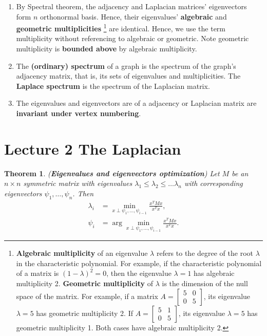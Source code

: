 \documentclass[]{article}
\newtheorem{theorem}{Theorem}[section]
\begin{document}
	\begin{enumerate}
		\item By Spectral theorem, the adjacency and Laplacian matrices' eigenvectors form $n$ orthonormal basis. Hence, their eigenvalues' \textbf{algebraic} and \textbf{geometric multiplicities} \footnote{\textbf{Algebraic multiplicity} of an eigenvalue $\lambda$ refers to the degree of the root $\lambda$ in the characteristic polynomial. For example, if the characteristic polynomial of a matrix is $(1-\lambda)^2=0$, then the eigenvalue $\lambda=1$ has algebraic multiplicity 2. \textbf{Geometric multiplicity} of $\lambda$ is the dimension of the null space of the matrix. For example, if a matrix $A = \begin{bmatrix}
			5 & 0 \\
			0 & 5
			\end{bmatrix}$, its eigenvalue $\lambda=5$ has geometric multiplicity 2. If $A = \begin{bmatrix}
			5 & 1 \\
			0 & 5
			\end{bmatrix}$, its eigenvalue $\lambda=5$ has geometric multiplicity 1. Both cases have algebraic multiplicity 2.} are identical. Hence, we use the term multiplicity without referencing to algebraic or geometric. Note geometric multiplicity is \textbf{bounded above} by algebraic multiplicity.
		\item The \textbf{(ordinary) spectrum} of a graph is the spectrum of the graph's adjacency matrix, that is, its sets of eigenvalues and multiplicities. The \textbf{Laplace spectrum} is the spectrum of the Laplacian matrix. 
		\item The eigenvalues and eigenvectors are of a adjacency or Laplacian matrix are \textbf{invariant under vertex numbering}. 
	\end{enumerate}
	
	\section{Lecture 2 The Laplacian}
	
	\begin{theorem} (\textbf{Eigenvalues and eigenvectors optimization})
		Let $M$ be an $n \times n$ symmetric matrix with eigenvalues $\lambda_1 \le \lambda_2 \le \dots \lambda_n$ with corresponding eigenvectors $\psi_1, \dots, \psi_n$. Then 
		\begin{align*}
		\lambda_i &= \min_{x \perp \psi_1, \dots, \psi_{i-1}} \frac{x^T M x}{x^T x}, \\
		\psi_i &= \arg\min_{x \perp \psi_1, \dots, \psi_{i-1}} \frac{x^T M x}{x^T x}.
		\end{align*}
	\end{theorem}
	
\end{document}
